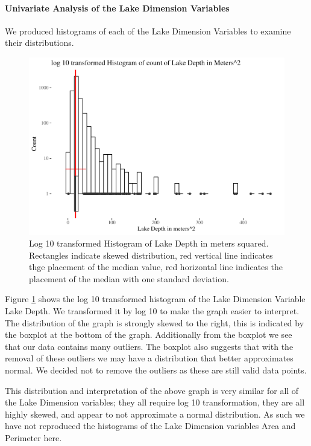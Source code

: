 \documentclass[
]{article}
\begin{document}
\hypertarget{univariate-analysis-of-the-lake-dimension-variables}{%
\paragraph{Univariate Analysis of the Lake Dimension Variables}\label{univariate-analysis-of-the-lake-dimension-variables}}

We produced histograms of each of the Lake Dimension Variables to examine their distributions.

\begin{figure}
\centering
\includegraphics{Final-Report_files/figure-latex/HistDepth-1.pdf}
\caption{\label{fig:HistDepth}Log 10 transformed Histogram of Lake Depth in meters squared. Rectangles indicate skewed distribution, red vertical line indicates thge placement of the median value, red horizontal line indicates the placement of the median with one standard deviation.}
\end{figure}

Figure \ref{fig:HistDepth} shows the log 10 transformed histogram of the Lake Dimension Variable Lake Depth. We transformed it by log 10 to make the graph easier to interpret. The distribution of the graph is strongly skewed to the right, this is indicated by the boxplot at the bottom of the graph. Additionally from the boxplot we see that our data contains many outliers. The boxplot also suggests that with the removal of these outliers we may have a distribution that better approximates normal. We decided not to remove the outliers as these are still valid data points.

This distribution and interpretation of the above graph is very similar for all of the Lake Dimension variables; they all require log 10 transformation, they are all highly skewed, and appear to not approximate a normal distribution. As such we have not reproduced the histograms of the Lake Dimension variables Area and Perimeter here.
\end{document}
